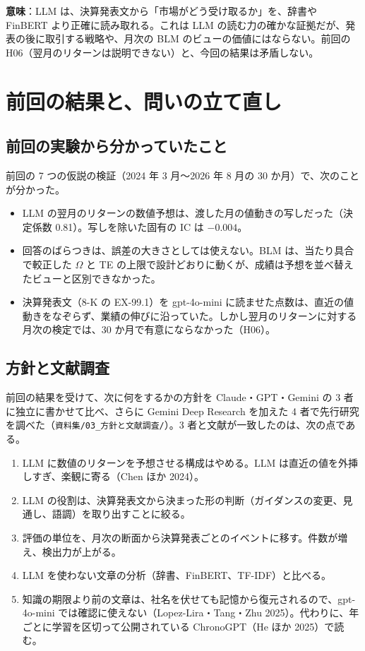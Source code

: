 \documentclass[xelatex,ja=standard,jafont=haranoaji,a4paper,10pt,openany]{bxjsreport}
\newcommand{\code}[1]{\texttt{#1}}
\begin{document}
\textbf{意味}：LLM は、決算発表文から「市場がどう受け取るか」を、辞書や FinBERT より正確に読み取れる。これは LLM の読む力の確かな証拠だが、発表の後に取引する戦略や、月次の BLM のビューの価値にはならない。前回の H06（翌月のリターンは説明できない）と、今回の結果は矛盾しない。

\setcounter{tocdepth}{1}
{\small\tableofcontents}

\chapter{前回の結果と、問いの立て直し}\label{ch:intro}

\section{前回の実験から分かっていたこと}

前回の 7 つの仮説の検証（2024 年 3 月〜2026 年 8 月の 30 か月）で、次のことが分かった。

\begin{itemize}
\item LLM の翌月のリターンの数値予想は、渡した月の値動きの写しだった（決定係数 0.81）。写しを除いた固有の IC は $-0.004$。
\item 回答のばらつきは、誤差の大きさとしては使えない。BLM は、当たり具合で較正した $\Omega$ と TE の上限で設計どおりに動くが、成績は予想を並べ替えたビューと区別できなかった。
\item 決算発表文（8-K の EX-99.1）を gpt-4o-mini に読ませた点数は、直近の値動きをなぞらず、業績の伸びに沿っていた。しかし翌月のリターンに対する月次の検定では、30 か月で有意にならなかった（H06）。
\end{itemize}

\section{方針と文献調査}

前回の結果を受けて、次に何をするかの方針を Claude・GPT・Gemini の 3 者に独立に書かせて比べ、さらに Gemini Deep Research を加えた 4 者で先行研究を調べた（\code{資料集/03\_方針と文献調査/}）。3 者と文献が一致したのは、次の点である。

\begin{enumerate}
\item LLM に数値のリターンを予想させる構成はやめる。LLM は直近の値を外挿しすぎ、楽観に寄る（Chen ほか 2024）。
\item LLM の役割は、決算発表文から決まった形の判断（ガイダンスの変更、見通し、語調）を取り出すことに絞る。
\item 評価の単位を、月次の断面から決算発表ごとのイベントに移す。件数が増え、検出力が上がる。
\item LLM を使わない文章の分析（辞書、FinBERT、TF-IDF）と比べる。
\item 知識の期限より前の文章は、社名を伏せても記憶から復元されるので、gpt-4o-mini では確認に使えない（Lopez-Lira・Tang・Zhu 2025）。代わりに、年ごとに学習を区切って公開されている ChronoGPT（He ほか 2025）で読む。
\end{enumerate}
\end{document}
